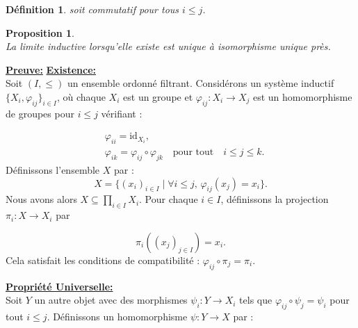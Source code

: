\documentclass[a4paper, 14pt]{report}
\newtheorem{definition}{Définition}[section]
\newtheorem{proposition}{Proposition}[section]
\begin{document}
\begin{onehalfspace}
{\begin{definition}
				soit commutatif pour tous $i \leq j$.
				
			\end{definition}
			
			\begin{proposition} \cite{ribes-zalesskii} \\
				La limite inductive lorsqu'elle existe est unique à isomorphisme unique près.
			\end{proposition}
			
			
			\textbf{\underline {Preuve:} }
			\textbf{\underline{Existence:}}\\
			Soit \((I, \leq)\) un ensemble ordonné filtrant. Considérons un système inductif \(\{X_i, \varphi_{ij}\}_{i \in I}\), où chaque \(X_i\) est un groupe et \(\varphi_{ij} : X_i \to X_j\) est un homomorphisme  de groupes pour \(i \leq j\) vérifiant :
			
			\[
			\begin{aligned}
				&\varphi_{ii} = \text{id}_{X_i}, \\
				&\varphi_{ik} = \varphi_{ij} \circ \varphi_{jk} \quad \text{pour tout} \quad i \leq j \leq k.
			\end{aligned}
			\]
			Définissons l'ensemble \(X\) par :
			\[
			X = \{(x_i)_{i \in I} \mid \forall i \leq j, \, \varphi_{ij}(x_j) = x_i\}.
			\]
			Nous avons alors \(X \subseteq \prod_{i \in I} X_i\).
			Pour chaque \(i \in I\), définissons la projection \(\pi_i : X \to X_i\) par 
			
			\[
			\pi_i((x_j)_{j \in I}) = x_i.
			\]
			Cela satisfait les conditions de compatibilité : \(\varphi_{ij} \circ \pi_j = \pi_i\).
			
			\textbf{\underline{Propriété Universelle:}}\\
			Soit \(Y\) un autre objet avec des morphismes \(\psi_i : Y \to X_i\) tels que \(\varphi_{ij} \circ \psi_j = \psi_i\) pour tout \(i \leq j\). Définissons un homomorphisme \(\psi : Y \to X\) par :
			
}
\end{onehalfspace}
\end{document}
